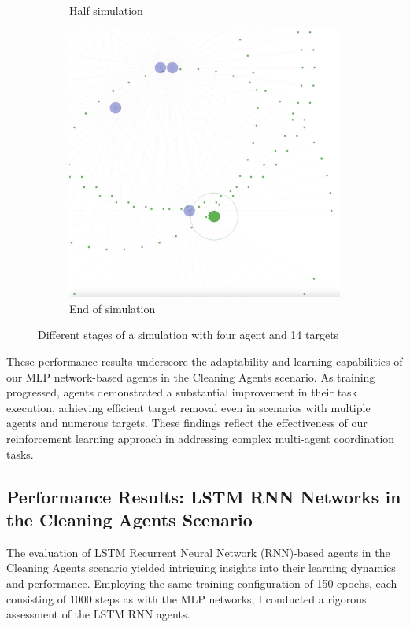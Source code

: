 \documentclass{scrartcl}
\begin{document}
\begin{figure}
\begin{subfigure}[b]{0.45\textwidth}
      \caption{Half simulation}
      \label{fig:s_mel}
  \end{subfigure}
  \hfill
  \begin{subfigure}[b]{0.45\textwidth}
      \centering
      \includegraphics[width=\textwidth]{img/4_agents_3.png}
      \caption{End of simulation} 
      \label{fig:s_ser}
  \end{subfigure}
  \caption{Different stages of a simulation with four agent and 14 targets}
  \label{fig:t}
\end{figure}


These performance results underscore the adaptability and learning capabilities of our MLP network-based agents in the Cleaning Agents scenario. As training progressed, agents demonstrated a substantial improvement in their task execution, achieving efficient target removal even in scenarios with multiple agents and numerous targets. These findings reflect the effectiveness of our reinforcement learning approach in addressing complex multi-agent coordination tasks.

\subsection{Performance Results: LSTM RNN Networks in the Cleaning Agents Scenario}

The evaluation of LSTM Recurrent Neural Network (RNN)-based agents in the Cleaning Agents scenario yielded intriguing insights into their learning dynamics and performance. Employing the same training configuration of 150 epochs, each consisting of 1000 steps as with the MLP networks, I conducted a rigorous assessment of the LSTM RNN agents.
\end{document}

